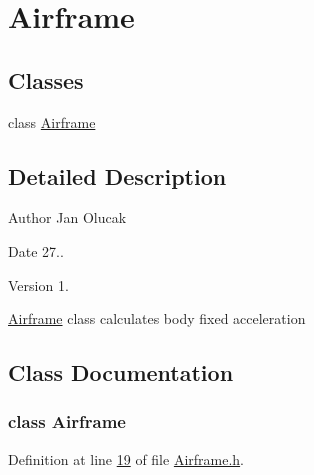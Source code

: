 \hypertarget{group___airframe}{}\section{Airframe}
\label{group___airframe}
\subsection*{Classes}
\begin{DoxyCompactItemize}
\item 
class \hyperlink{group___airframe_class_airframe}{Airframe}
\end{DoxyCompactItemize}


\subsection{Detailed Description}
\begin{DoxyAuthor}{Author}
Jan Olucak 
\end{DoxyAuthor}
\begin{DoxyDate}{Date}
27.. 
\end{DoxyDate}
\begin{DoxyVersion}{Version}
1.
\end{DoxyVersion}
\hyperlink{group___airframe_class_airframe}{Airframe} class calculates body fixed acceleration 

\subsection{Class Documentation}
\label{class_airframe}
\subsubsection{class Airframe}


Definition at line \hyperlink{_airframe_8h_source_l00019}{19} of file \hyperlink{_airframe_8h_source}{Airframe.\+h}.

